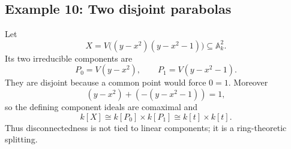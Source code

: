 \subsection*{Example 10: Two disjoint parabolas}

Let
\[
X=V\bigl((y-x^2)(y-x^2-1)\bigr)\subseteq\mathbb A_k^2.
\]
Its two irreducible components are
\[
P_0=V(y-x^2),\qquad P_1=V(y-x^2-1).
\]
They are disjoint because a common point would force \(0=1\).  Moreover
\[
(y-x^2)+( -(y-x^2-1))=1,
\]
so the defining component ideals are comaximal and
\[
k[X]\cong k[P_0]\times k[P_1]\cong k[t]\times k[t].
\]
Thus disconnectedness is not tied to linear components; it is a ring-theoretic splitting.
